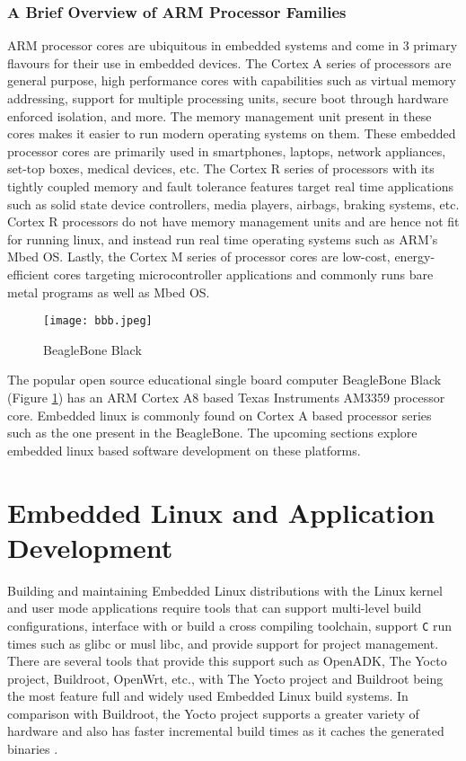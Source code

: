 \subsubsection{A Brief Overview of ARM Processor Families}

ARM processor cores are ubiquitous in embedded systems and come in 3 primary flavours for their use in embedded devices. The Cortex A series of processors are general purpose, high performance cores with capabilities such as virtual memory addressing, support for multiple processing units, secure boot through hardware enforced isolation, and more. The memory management unit present in these cores makes it easier to run modern operating systems on them. These embedded processor cores are primarily used in smartphones, laptops, network appliances, set-top boxes, medical devices, etc. The Cortex R series of processors with its tightly coupled memory and fault tolerance features target real time applications such as solid state device controllers, media players, airbags, braking systems, etc. Cortex R processors do not have memory management units and are hence not fit for running linux, and instead run real time operating systems such as ARM's Mbed OS. Lastly, the Cortex M series of processor cores are low-cost, energy-efficient cores targeting microcontroller applications and commonly runs bare metal programs as well as Mbed OS.

\begin{figure}[h]
	\centering
	\texttt{[image: bbb.jpeg]}
	\caption{BeagleBone Black}
	\label{fig:bbb}
\end{figure}

The popular open source educational single board computer BeagleBone Black (Figure \ref{fig:bbb}) has an ARM Cortex A8 based Texas Instruments AM3359 processor core. Embedded linux is commonly found on Cortex A based processor series such as the one present in the BeagleBone. The upcoming sections explore embedded linux based software development on these platforms.

\section{Embedded Linux and Application Development}

Building and maintaining Embedded Linux distributions with the Linux kernel and user mode applications require tools that can support multi-level build configurations, interface with or build a cross compiling toolchain, support \texttt{C} run times such as glibc or musl libc, and provide support for project management. There are several tools that provide this support such as OpenADK, The Yocto project, Buildroot, OpenWrt, etc., with The Yocto project and Buildroot being the most feature full and widely used Embedded Linux build systems. In comparison with Buildroot, the Yocto project supports a greater variety of hardware and also has faster incremental build times as it caches the generated binaries \cite{yocto}.

